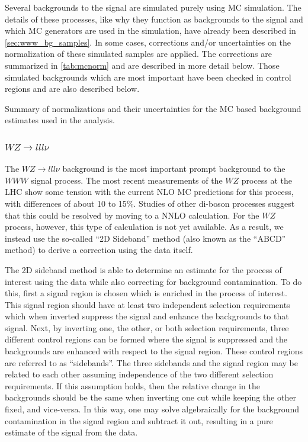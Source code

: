 

Several backgrounds to the signal are simulated purely using MC simulation.
The details of these processes, like why they function as backgrounds
to the signal and which MC generators are used in the simulation,
have already been described in \sec\ref{sec:www_bg_samples}.
In some cases, corrections and/or uncertainties on 
the normalization of these simulated samples are applied. 
The corrections are summarized in \tab\ref{tab:mcnorm} and are described
in more detail below.
Those simulated backgrounds
which are most important have been checked in control regions and are 
also described below.

\begin{table}[htp]
\centering

\caption{Summary of normalizations and their uncertainties for the
MC based background estimates used in the analysis.}
\label{tab:mcnorm}
\end{table}



\subsubsection{$WZ\rightarrow lll\nu$}
\label{sec:wzbg}

The $WZ\rightarrow lll \nu$ background is the most important prompt background 
to the $WWW$ signal process. 
The most recent measurements of the $WZ$ process at the LHC
\cite{Aad:2012twa,Anger:1663539,CMS-PAS-SMP-12-006} 
show some tension with the current NLO MC predictions for this process, 
with differences of about 10 to 15\%. 
Studies of other di-boson processes 
\cite{Grazzini:2015nwa,Cascioli:2014yka}
suggest that this could be resolved by 
moving to a NNLO calculation.
For the $WZ$ process, however, this type of calculation is not yet available.
As a result, we instead use the so-called ``2D Sideband'' method (also known as the 
``ABCD'' method) \cite{Aad:2013izg} to derive a correction using the data itself.

The 2D sideband method is able to determine an estimate
for the process of interest using the data while also correcting
for background contamination. 
To do this, first a signal region 
is chosen which is enriched in the process of interest.
This signal region should have at least two 
independent selection requirements which when inverted suppress
the signal and enhance the backgrounds to that signal.
Next, by inverting one, the other, or both selection requirements, 
three different control regions can be formed
where the signal is suppressed and the backgrounds are enhanced 
with respect to the signal region. 
These control regions are referred to as ``sidebands''.
The three sidebands and the signal region may be
related to each other assuming independence of the two different selection
requirements. If this assumption holds, then the relative change in the 
backgrounds should be the same
when inverting one cut while keeping the other fixed, and vice-versa.
In this way, one may solve algebraically for the background contamination 
in the signal region and subtract it out, resulting in a pure
estimate of the signal from the data. 


